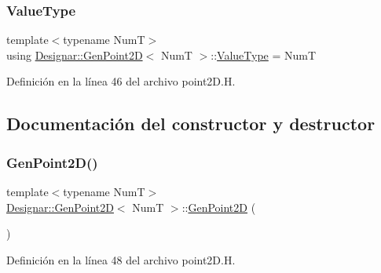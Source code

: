 \subsubsection{\texorpdfstring{Value\+Type}{ValueType}}
{\footnotesize\ttfamily template$<$typename NumT$>$ \\
using \hyperlink{class_designar_1_1_gen_point2_d}{Designar\+::\+Gen\+Point2D}$<$ NumT $>$\+::\hyperlink{class_designar_1_1_gen_point2_d_a8f13f44ca3438223d1ecdce2728b9437}{Value\+Type} =  NumT}



Definición en la línea 46 del archivo point2\+D.\+H.



\subsection{Documentación del constructor y destructor}
\mbox{\label{class_designar_1_1_gen_point2_d_aa55395ebde205564d3065dc6ce56c42b}} 
\subsubsection{\texorpdfstring{Gen\+Point2\+D()}{GenPoint2D()}\hspace{0.1cm}{\footnotesize\ttfamily [1/7]}}
{\footnotesize\ttfamily template$<$typename NumT$>$ \\
\hyperlink{class_designar_1_1_gen_point2_d}{Designar\+::\+Gen\+Point2D}$<$ NumT $>$\+::\hyperlink{class_designar_1_1_gen_point2_d}{Gen\+Point2D} (\begin{DoxyParamCaption}{ }\end{DoxyParamCaption})\hspace{0.3cm}{\ttfamily [inline]}}



Definición en la línea 48 del archivo point2\+D.\+H.

\mbox{\label{class_designar_1_1_gen_point2_d_adf5298d432b48187deef32941429a1b3}} 
